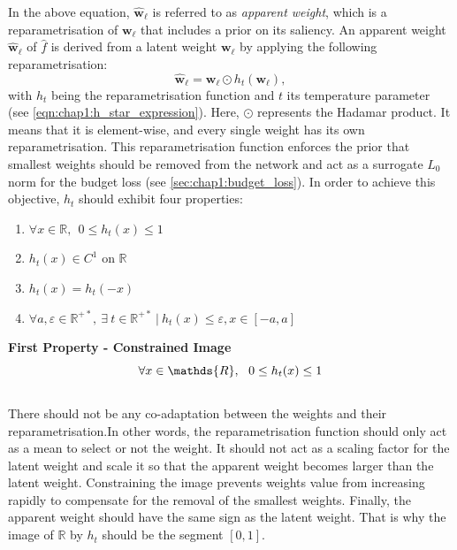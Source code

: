 \noindent In the above equation, $\mathbf{\hat w}_\ell$ is referred to as
\textit{apparent weight}, which is a reparametrisation of $\mathbf{w}_\ell$ that
includes a prior on its saliency. An apparent weight $\mathbf{\hat w}_\ell$ of
$\hat{f}$ is derived from a latent weight $\mathbf{w}_\ell$ by applying the
following reparametrisation: 
\begin{equation}
  \label{eqn:reparam}
  \mathbf{\hat w}_\ell = \mathbf{w}_\ell  \odot h_t(\mathbf{w}_\ell),
\end{equation}
\noindent with $h_t$ being the reparametrisation function and $t$ its
temperature parameter (see \cref{eqn:chap1:h_star_expression}). Here, $\odot$
represents the Hadamar product. It means that it is element-wise, and every
single weight has its own reparametrisation. This reparametrisation function
enforces the prior that smallest weights should be removed from the network and
act as a surrogate $L_0$ norm for the budget loss (see
\cref{sec:chap1:budget_loss}). In order to achieve this objective, $h_t$ should
exhibit four properties: \\

\begin{enumerate}
  \item $\forall x \in \mathds{R},~~ 0 \leq h_t(x) \leq 1 $
  \item $h_t(x) \in C^1 \text{ on } \mathds{R}$
  \item $h_t(x) = h_t(-x)$
  \item $\forall a,\varepsilon \in\mathds{R}^{+\ast},~ \exists ~t
  \in\mathds{R}^{+\ast} ~ | ~ h_t(x) \leq \varepsilon, x \in [-a,a]$
\end{enumerate}

\noindent\textbf{First Property - Constrained Image} \\
\begin{equation}
    \centering
    \forall x \in \mathds{R},~~ 0 \leq h_t(x) \leq 1
    \label{eqn:chap1:reparam_prop1}
\end{equation}
\\
There should not be any co-adaptation between the weights and their
reparametrisation.In other words, the reparametrisation function should only act
as a mean to select or not the weight. It should not act as a scaling factor for
the latent weight and scale it so that the apparent weight becomes larger than
the latent weight. Constraining the image prevents weights value from increasing
rapidly to compensate for the removal of the smallest weights. Finally, the
apparent weight should have the same sign as the latent weight. That is why the
image of $\mathbb{R}$ by $h_t$ should be the segment $[0,1]$.\\

